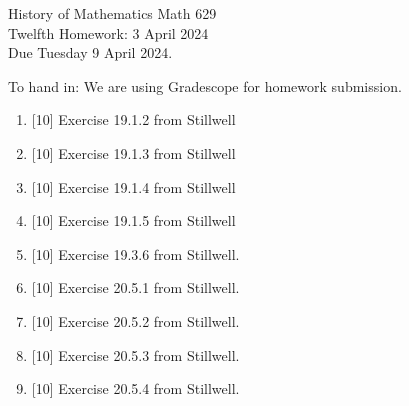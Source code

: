 \documentclass[12pt]{article}
\begin{document}
\LARGE 
\noindent
{\color{Maroon}History of Mathematics \hfill Math 629}\vspace{2pt}\\
\large
Twelfth Homework: \hfill 3 April 2024\\
Due Tuesday 9 April 2024.
\normalsize\vspace{10pt}

To hand in: We are using Gradescope for homework submission.

\begin{enumerate}

\item  {[10]}
     Exercise 19.1.2 from Stillwell 
\item  {[10]}
     Exercise 19.1.3 from Stillwell 
\item  {[10]}
     Exercise 19.1.4 from Stillwell 
\item  {[10]}
     Exercise 19.1.5 from Stillwell 

\item  {[10]}
  Exercise 19.3.6 from Stillwell.

\item  {[10]}
  Exercise 20.5.1 from Stillwell.
\item  {[10]}
  Exercise 20.5.2 from Stillwell.
\item  {[10]}
  Exercise 20.5.3 from Stillwell.
\item  {[10]}
  Exercise 20.5.4 from Stillwell.

  \end{enumerate}
\end{document}
